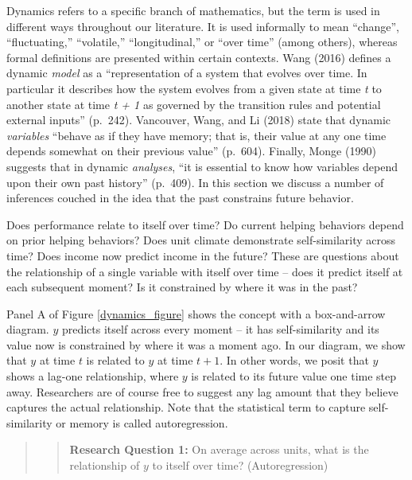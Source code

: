 \documentclass[english,,man]{apa6}
\theoremstyle{definition}
\theoremstyle{definition}
\theoremstyle{definition}
\theoremstyle{remark}
\begin{document}
Dynamics refers to a specific branch of mathematics, but the term is
used in different ways throughout our literature. It is used informally
to mean \enquote{change}, \enquote{fluctuating,} \enquote{volatile,}
\enquote{longitudinal,} or \enquote{over time} (among others), whereas
formal definitions are presented within certain contexts. Wang (2016)
defines a dynamic \emph{model} as a \enquote{representation of a system
that evolves over time. In particular it describes how the system
evolves from a given state at time \emph{t} to another state at time
\emph{t + 1} as governed by the transition rules and potential external
inputs} (p.~242). Vancouver, Wang, and Li (2018) state that dynamic
\emph{variables} \enquote{behave as if they have memory; that is, their
value at any one time depends somewhat on their previous value}
(p.~604). Finally, Monge (1990) suggests that in dynamic
\emph{analyses}, \enquote{it is essential to know how variables depend
upon their own past history} (p.~409). In this section we discuss a
number of inferences couched in the idea that the past constrains future
behavior.

Does performance relate to itself over time? Do current helping
behaviors depend on prior helping behaviors? Does unit climate
demonstrate self-similarity across time? Does income now predict income
in the future? These are questions about the relationship of a single
variable with itself over time -- does it predict itself at each
subsequent moment? Is it constrained by where it was in the past?

Panel A of Figure \ref{dynamics_figure} shows the concept with a
box-and-arrow diagram. \(y\) predicts itself across every moment -- it
has self-similarity and its value now is constrained by where it was a
moment ago. In our diagram, we show that \(y\) at time \(t\) is related
to \(y\) at time \(t + 1\). In other words, we posit that \(y\) shows a
lag-one relationship, where \(y\) is related to its future value one
time step away. Researchers are of course free to suggest any lag amount
that they believe captures the actual relationship. Note that the
statistical term to capture self-similarity or memory is called
autoregression.

\begin{quote}
\begin{quote}
\textbf{Research Question 1:} On average across units, what is the
relationship of \(y\) to itself over time? (Autoregression)
\end{quote}
\end{quote}
\end{document}
